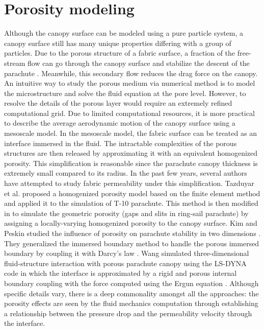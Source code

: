 \section{Porosity modeling}
Although the canopy surface can be modeled using a pure particle system, a canopy surface still has many unique properties differing with a group of particles. 
Due to the porous structure of a
fabric surface, a fraction of the free-stream flow can go through the canopy
surface and stabilize the descent of the parachute \cite{Johari05}. 
Meanwhile, this secondary flow reduces the drag force on the canopy. 
An intuitive way to study the porous medium via numerical method is to model the microstructure and solve the fluid equation at the pore level. However, to resolve the details of the porous layer would require an extremely 
refined computational grid. Due to limited computational resources, it 
is more practical to describe the average aerodynamic motion of the 
canopy surface using a mesoscale model. In the mesoscale model, the 
fabric surface can be treated as an interface immersed in the fluid.
The intractable complexities of the porous structures are then released by 
approximating it with an equivalent homogenized porosity.  
This simplification is reasonable since the parachute canopy thickness is
extremely small compared to its radius. In the past few years, 
several authors have attempted to study fabric permeability
under this simplification. Tazduyar et al. \cite{Tezduyar2008Fluid} proposed a
homogenized porosity model based on the finite element method and applied it 
to the simulation of T-10 parachute. This method is then modified in \cite{Takizawa2012Computational} to simulate the geometric porosity (gaps and slits in ring-sail parachute) by assigning a locally-varying homogenized porosity to the canopy surface. 
Kim and Peskin studied the influence of porosity on
parachute stability in two dimensions \cite{Kim2006TwoDimensional}. They generalized
the immersed boundary method \cite{peskin2002immersed} to handle the porous immersed boundary by 
coupling it with Darcy's law \cite{Nield2013}.  Wang \cite{wang2006porous} simulated 
three-dimensional fluid-structure interaction with porous parachute canopy using the
LS-DYNA code in which the interface is approximated by a rigid and porous
internal boundary coupling with the force computed using the Ergun equation \cite{Nield2013}. Although specific details vary, there is a deep commonality amongst all the approaches: the porosity effects are seen by the fluid mechanics computation through establishing a relationship between the pressure drop and the permeability velocity through the interface.

